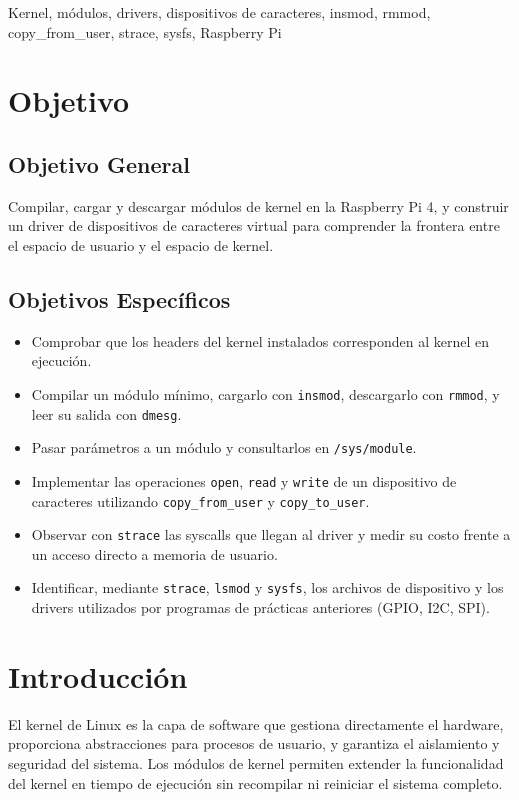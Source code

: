 \documentclass[conference]{IEEEtran}
\begin{document}
\begin{IEEEkeywords}
	Kernel, módulos, drivers, dispositivos de caracteres, insmod, rmmod, copy\_from\_user, strace, sysfs, Raspberry Pi
\end{IEEEkeywords}

\section{Objetivo}

\subsection{Objetivo General}
Compilar, cargar y descargar módulos de kernel en la Raspberry Pi 4, y construir un driver de dispositivos de caracteres virtual para comprender la frontera entre el espacio de usuario y el espacio de kernel.

\subsection{Objetivos Específicos}
\begin{itemize}
	\item Comprobar que los headers del kernel instalados corresponden al kernel en ejecución.
	\item Compilar un módulo mínimo, cargarlo con \texttt{insmod}, descargarlo con \texttt{rmmod}, y leer su salida con \texttt{dmesg}.
	\item Pasar parámetros a un módulo y consultarlos en \texttt{/sys/module}.
	\item Implementar las operaciones \texttt{open}, \texttt{read} y \texttt{write} de un dispositivo de caracteres utilizando \texttt{copy\_from\_user} y \texttt{copy\_to\_user}.
	\item Observar con \texttt{strace} las syscalls que llegan al driver y medir su costo frente a un acceso directo a memoria de usuario.
	\item Identificar, mediante \texttt{strace}, \texttt{lsmod} y \texttt{sysfs}, los archivos de dispositivo y los drivers utilizados por programas de prácticas anteriores (GPIO, I2C, SPI).
\end{itemize}

\section{Introducción}

El kernel de Linux es la capa de software que gestiona directamente el hardware, proporciona abstracciones para procesos de usuario, y garantiza el aislamiento y seguridad del sistema. Los módulos de kernel permiten extender la funcionalidad del kernel en tiempo de ejecución sin recompilar ni reiniciar el sistema completo.
\end{document}
